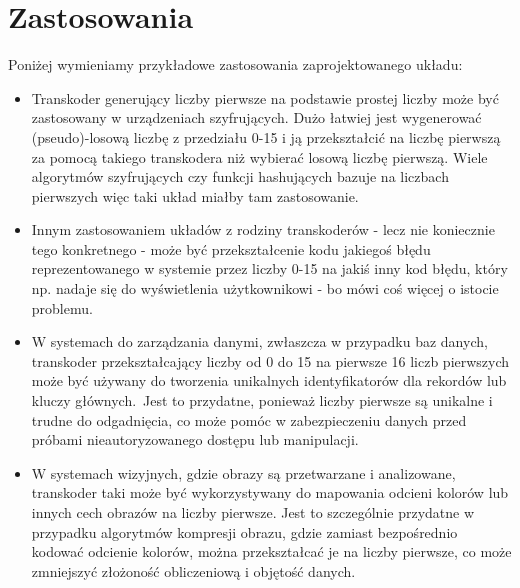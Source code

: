 \documentclass[a4paper]{article}
\begin{document}
\section{Zastosowania}
Poniżej wymieniamy przykładowe zastosowania zaprojektowanego układu:
\begin{itemize}
  \item Transkoder generujący liczby pierwsze na podstawie prostej liczby może być zastosowany w urządzeniach 
      szyfrujących. Dużo łatwiej jest wygenerować (pseudo)-losową liczbę z przedziału 0-15 i ją przekształcić na
      liczbę pierwszą za pomocą takiego transkodera niż wybierać losową liczbę pierwszą. Wiele algorytmów szyfrujących
      czy funkcji hashujących bazuje na liczbach pierwszych więc taki układ miałby tam zastosowanie.
  \item Innym zastosowaniem układów z rodziny transkoderów - lecz nie koniecznie tego konkretnego - może być 
      przekształcenie kodu jakiegoś błędu reprezentowanego w systemie przez liczby 0-15 na jakiś inny kod błędu, 
      który np. nadaje się do wyświetlenia użytkownikowi - bo mówi coś więcej o istocie problemu.
  \item W systemach do zarządzania danymi, zwłaszcza w przypadku baz danych,
      transkoder przekształcający liczby od 0 do 15 na pierwsze 16 liczb pierwszych może być
      używany do tworzenia unikalnych identyfikatorów dla rekordów lub kluczy głównych.\
      Jest to przydatne, ponieważ liczby pierwsze są unikalne i trudne do odgadnięcia,
      co może pomóc w zabezpieczeniu danych przed próbami nieautoryzowanego dostępu lub manipulacji.

  \item W systemach wizyjnych, gdzie obrazy są przetwarzane i analizowane,
   transkoder taki może być wykorzystywany do mapowania odcieni kolorów lub innych cech obrazów na liczby pierwsze.
    Jest to szczególnie przydatne w przypadku algorytmów kompresji obrazu,
     gdzie zamiast bezpośrednio kodować odcienie kolorów, można przekształcać je na liczby pierwsze,
      co może zmniejszyć złożoność obliczeniową i objętość danych.
\end{itemize}
\end{document}
